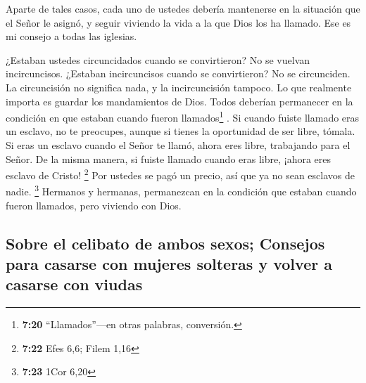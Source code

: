  Aparte de tales casos, cada uno de ustedes debería
mantenerse en la situación que el Señor le asignó, y seguir viviendo la
vida a la que Dios los ha llamado. Ese es mi consejo a todas las
iglesias.

 ¿Estaban ustedes circuncidados cuando se convirtieron?
No se vuelvan incircuncisos. ¿Estaban incircuncisos cuando se
convirtieron? No se circunciden.  La circuncisión no
significa nada, y la incircuncisión tampoco. Lo que realmente importa es
guardar los mandamientos de Dios.  Todos deberían
permanecer en la condición en que estaban cuando fueron
llamados\footnote{\textbf{7:20} ``Llamados''---en otras palabras,
  conversión.} .  Si cuando fuiste llamado eras un
esclavo, no te preocupes, aunque si tienes la oportunidad de ser libre,
tómala.  Si eras un esclavo cuando el Señor te llamó,
ahora eres libre, trabajando para el Señor. De la misma manera, si
fuiste llamado cuando eras libre, ¡ahora eres esclavo de Cristo!
\footnote{\textbf{7:22} Efes 6,6; Filem 1,16}  Por
ustedes se pagó un precio, así que ya no sean esclavos de nadie.
\footnote{\textbf{7:23} 1Cor 6,20}  Hermanos y hermanas,
permanezcan en la condición que estaban cuando fueron llamados, pero
viviendo con Dios.

\hypertarget{sobre-el-celibato-de-ambos-sexos-consejos-para-casarse-con-mujeres-solteras-y-volver-a-casarse-con-viudas}{%
\subsection{Sobre el celibato de ambos sexos; Consejos para casarse con
mujeres solteras y volver a casarse con
viudas}\label{sobre-el-celibato-de-ambos-sexos-consejos-para-casarse-con-mujeres-solteras-y-volver-a-casarse-con-viudas}}

